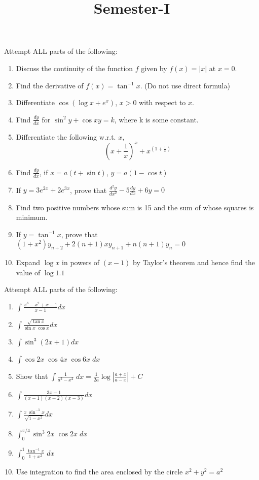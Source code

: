 \documentclass[12pt]{article}
\title{Semester-I}
\begin{document}
 
\begin{questions}
	\question Attempt ALL parts of the following: 
	\begin{enumerate}
	\item Discuss the continuity of the function $f$ given by $f(x) = |x|$ at $x=0$.
	\item Find the derivative of $ \displaystyle  f(x) = \tan^{-1} x$. (Do not use direct formula)
	\item Differentiate $ \displaystyle \cos (\log x + e^x )$, $x>0$ with respect to $x$.
	\item Find $ \displaystyle \frac{dy}{dx}$ for $\displaystyle \sin^2 y + \cos xy =k$, where k is some constant.
	\item Differentiate the following w.r.t. $x$,
	\[\left(x + \frac{1}{x}\right)^x + x^{\left(1 + \frac{1}{x}\right)}\]
	\item Find $\displaystyle \frac{dy}{dx}$, if $x = a(t + \sin t)$, $y=a(1-\cos t)$
	\item If $y=3e^{2x} + 2e^{3x}$, prove that $\displaystyle \frac{d^2y}{dx^2} - 5 \frac{dy}{dx} + 6y = 0$
	\item Find two positive numbers whose sum is 15 and the sum of whose squares is minimum.
	\item If $y=\tan^{-1} x$, prove that $(1+x^2)y_{n+2} + 2(n+1) x y_{n+1} + n(n+1)y_{n} = 0$
\item Expand $\log x$ in powers of $(x-1)$ by Taylor's theorem and hence find the value of $\log 1.1$	
	\end{enumerate}
\item Attempt ALL parts of the following: 
\begin{enumerate}
\item $ \displaystyle \int{\frac{x^3-x^2+x-1}{x-1}} dx$
\item $ \displaystyle \int{\frac{\sqrt{\tan x}}{\sin x \; \cos x}} dx$
\item $ \displaystyle \int{\sin^3 (2x+1)} dx$
\item $ \displaystyle \int{\cos 2x \;\cos 4x \;\cos 6x}\; dx$
\newpage
\item Show that
$ \displaystyle \int{\frac{1}{a^2 - x^2}}\;dx = \frac{1}{2a } \log \left|\frac{a+x}{a-x}\right| + C$
\item $ \displaystyle \int{\frac{3x-1}{(x-1)(x-2)(x-3)}} dx$
\item $ \displaystyle \int{\frac{x\; \sin^{-1} x}{\sqrt{1-x^2}}} dx$
\item $ \displaystyle \int_{0}^{\pi /4}{\sin^3 2x \;\cos 2x }\; dx$
\item $ \displaystyle \int_{0}^{1}{\frac{\tan^{-1} x} {1+x^2}}\; dx$
\item Use integration to find the area enclosed by the circle $x^2 + y^2 = a^2$
\end{enumerate}
\end{questions}
\end{document}
